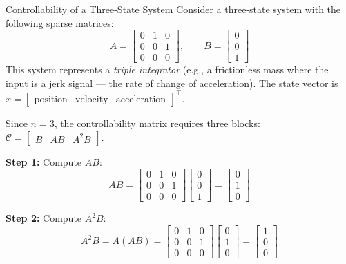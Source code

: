 \begin{examplebox}{Controllability of a Three-State System}
Consider a three-state system with the following sparse matrices:
\begin{equation*}
	A = \begin{bmatrix} 0 & 1 & 0 \\ 0 & 0 & 1 \\ 0 & 0 & 0 \end{bmatrix}, \qquad
	B = \begin{bmatrix} 0 \\ 0 \\ 1 \end{bmatrix}
\end{equation*}
This system represents a \textit{triple integrator} (e.g., a frictionless mass where the input is a jerk signal --- the rate of change of acceleration). The state vector is $x = \begin{bmatrix} \text{position} & \text{velocity} & \text{acceleration} \end{bmatrix}^\top$.

Since $n = 3$, the controllability matrix requires three blocks: $\mathcal{C} = \begin{bmatrix} B & AB & A^2 B \end{bmatrix}$.

\textbf{Step 1:} Compute $AB$:
\begin{equation*}
	AB = \begin{bmatrix} 0 & 1 & 0 \\ 0 & 0 & 1 \\ 0 & 0 & 0 \end{bmatrix}
	\begin{bmatrix} 0 \\ 0 \\ 1 \end{bmatrix}
	= \begin{bmatrix} 0 \\ 1 \\ 0 \end{bmatrix}
\end{equation*}

\textbf{Step 2:} Compute $A^2 B$:
\begin{equation*}
	A^2 B = A(AB) = \begin{bmatrix} 0 & 1 & 0 \\ 0 & 0 & 1 \\ 0 & 0 & 0 \end{bmatrix}
	\begin{bmatrix} 0 \\ 1 \\ 0 \end{bmatrix}
	= \begin{bmatrix} 1 \\ 0 \\ 0 \end{bmatrix}
\end{equation*}


\end{examplebox}

